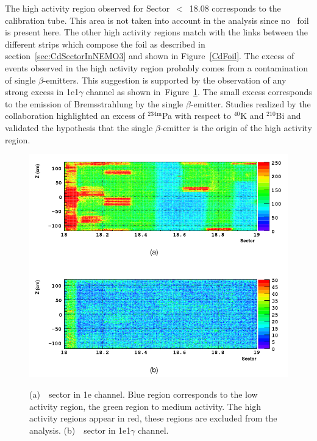 \documentclass[main.tex]{subfiles}
\begin{document}
\NI The high activity region observed for Sector~$<$~18.08 corresponds to the calibration tube. This area is not taken into account in the analysis since no \Cd~foil is present here. The other high activity regions match with the links between the different strips which compose the foil as described in section~\ref{sec:CdSectorInNEMO3} and shown in Figure~\ref{CdFoil}. The excess of events observed in the high activity region probably comes from a contamination of single $\beta$-emitters. This suggestion is supported by the observation of any strong excess in 1e1$\gamma$ channel as shown in~Figure~\ref{CdSector1eChannel}. The small excess corresponds to the emission of Bremsstrahlung by the single $\beta$-emitter. Studies realized by the collaboration highlighted an excess of $^{\text{234m}}$Pa with respect to $^{\text{40}}$K and $^{\text{210}}$Bi and validated the hypothesis that the single $\beta$-emitter is the origin of the high activity region.



\begin{figure}[h!]
\centering
\includegraphics[scale=0.40]{pictures/Chap6/CdSector-1e-1e1g.png}
\label{CdSector1eChannel}
\caption{(a)~\Cd~sector in 1e channel. Blue region corresponds to the low activity region, the green region to medium activity. The high activity regions appear in red, these regions are excluded from the analysis. (b)~\Cd~sector in 1e1$\gamma$ channel.}
\end{figure}
\end{document}
